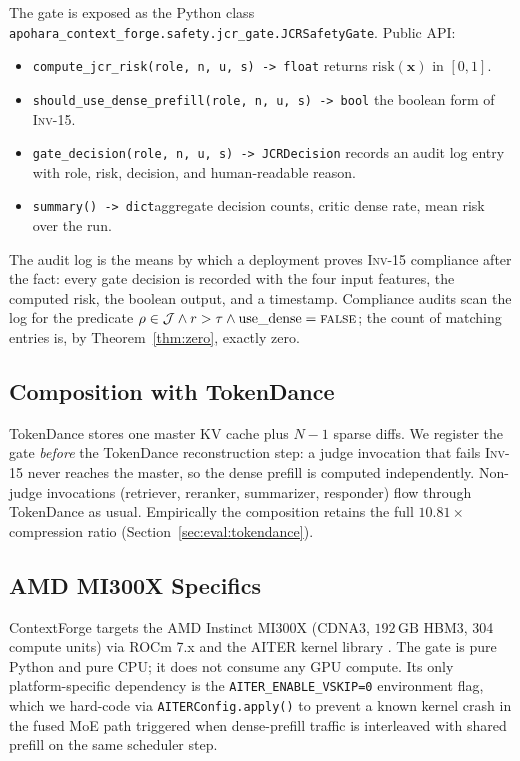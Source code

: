 \documentclass[10pt,twocolumn]{article}
\newcommand{\INV}[1]{\textsc{Inv-#1}}
\newcommand{\Risk}{\mathrm{risk}}
\newcommand{\Judge}{\mathcal{J}}
\newcommand{\code}[1]{\texttt{\small #1}}
\begin{document}
The gate is exposed as the Python class
\code{apohara\_\allowbreak{}context\_\allowbreak{}forge.\allowbreak{}safety.\allowbreak{}jcr\_\allowbreak{}gate.\allowbreak{}JCRSafetyGate}. Public API:

\begin{itemize}
  \item \code{compute\_jcr\_risk(role, n, u, s) -> float}\textemdash
        returns $\Risk(\mathbf{x})$ in $[0, 1]$.
  \item \code{should\_use\_dense\_prefill(role, n, u, s) -> bool}\textemdash
        the boolean form of \INV{15}.
  \item \code{gate\_decision(role, n, u, s) -> JCRDecision}\textemdash
        records an audit log entry with role, risk, decision, and
        human-readable reason.
  \item \code{summary() -> dict}\textemdash aggregate decision counts,
        critic dense rate, mean risk over the run.
\end{itemize}

The audit log is the means by which a deployment proves \INV{15}
compliance after the fact: every gate decision is recorded with the four
input features, the computed risk, the boolean output, and a timestamp.
Compliance audits scan the log for the predicate
$\rho \in \Judge \wedge r > \tau \wedge \mathrm{use\_dense} = \textsc{false}$;
the count of matching entries is, by Theorem~\ref{thm:zero}, exactly zero.

\subsection{Composition with TokenDance}
\label{sec:impl:tokendance}

TokenDance \cite{tokendance} stores one master KV cache plus $N-1$ sparse
diffs. We register the gate \emph{before} the TokenDance reconstruction
step: a judge invocation that fails \INV{15} never reaches the master, so
the dense prefill is computed independently. Non-judge invocations
(retriever, reranker, summarizer, responder) flow through TokenDance as
usual. Empirically the composition retains the full $10.81\times$
compression ratio (Section~\ref{sec:eval:tokendance}).

\subsection{AMD MI300X Specifics}
\label{sec:impl:mi300x}

ContextForge targets the AMD Instinct MI300X (CDNA3, $192\,\mathrm{GB}$
HBM3, 304 compute units) via ROCm 7.x and the AITER kernel library
\cite{aiter}. The gate is pure Python and pure CPU; it does not consume any
GPU compute. Its only platform-specific dependency is the
\texttt{AITER\_ENABLE\_VSKIP=0} environment flag, which we hard-code via
\code{AITERConfig.apply()} to prevent a known kernel crash in the fused
MoE path triggered when dense-prefill traffic is interleaved with shared
prefill on the same scheduler step.
\end{document}
